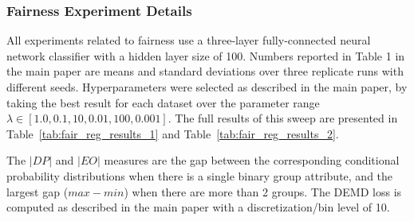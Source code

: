 \subsubsection{Fairness Experiment Details}
All experiments related to fairness use a three-layer fully-connected neural network classifier with a hidden layer size of 100. Numbers reported in Table 1 in the main paper are means and standard deviations over three replicate runs with different seeds.
Hyperparameters were selected as described in the main paper,
by taking the best result for each dataset over the parameter range $\lambda \in [1.0, 0.1, 10, 0.01, 100, 0.001]$. The full results of this sweep are presented in Table~\ref{tab:fair_reg_results_1} and Table~\ref{tab:fair_reg_results_2}.

The $|DP|$ and $|EO|$ measures are the gap between the corresponding conditional probability distributions when there is a single binary group attribute, and the largest gap ($max - min$) when there are more than 2 groups. The DEMD loss is computed as described in the main paper with a discretization/bin level of 10.



